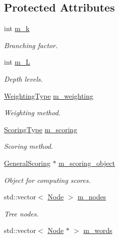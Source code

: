 \subsection*{Protected Attributes}
\begin{DoxyCompactItemize}
\item 
int \mbox{\hyperlink{class_d_bo_w2_1_1_templated_vocabulary_aa5f7f829033a49833fe4fb5652b99337}{m\+\_\+k}}
\begin{DoxyCompactList}\small\item\em Branching factor. \end{DoxyCompactList}\item 
int \mbox{\hyperlink{class_d_bo_w2_1_1_templated_vocabulary_a16735d9e2c8b901f01d541faea67971e}{m\+\_\+L}}
\begin{DoxyCompactList}\small\item\em Depth levels. \end{DoxyCompactList}\item 
\mbox{\hyperlink{namespace_d_bo_w2_a5de5c8a307aca9a84ffefda2a9bc467a}{Weighting\+Type}} \mbox{\hyperlink{class_d_bo_w2_1_1_templated_vocabulary_abf03c6430d630674ddca5bab9c120c51}{m\+\_\+weighting}}
\begin{DoxyCompactList}\small\item\em Weighting method. \end{DoxyCompactList}\item 
\mbox{\hyperlink{namespace_d_bo_w2_aa252a592dd607c6e60dede06ceef2722}{Scoring\+Type}} \mbox{\hyperlink{class_d_bo_w2_1_1_templated_vocabulary_a89d8aa037f2b5c3c5cc953734bb5cb9f}{m\+\_\+scoring}}
\begin{DoxyCompactList}\small\item\em Scoring method. \end{DoxyCompactList}\item 
\mbox{\hyperlink{class_d_bo_w2_1_1_general_scoring}{General\+Scoring}} $\ast$ \mbox{\hyperlink{class_d_bo_w2_1_1_templated_vocabulary_a34144d0e2056d6ed8b925a2937b67418}{m\+\_\+scoring\+\_\+object}}
\begin{DoxyCompactList}\small\item\em Object for computing scores. \end{DoxyCompactList}\item 
std\+::vector$<$ \mbox{\hyperlink{struct_d_bo_w2_1_1_templated_vocabulary_1_1_node}{Node}} $>$ \mbox{\hyperlink{class_d_bo_w2_1_1_templated_vocabulary_a82be6d310eae6f4f57a72d340489320b}{m\+\_\+nodes}}
\begin{DoxyCompactList}\small\item\em Tree nodes. \end{DoxyCompactList}\item 
std\+::vector$<$ \mbox{\hyperlink{struct_d_bo_w2_1_1_templated_vocabulary_1_1_node}{Node}} $\ast$ $>$ \mbox{\hyperlink{class_d_bo_w2_1_1_templated_vocabulary_a1665546b54f954d2d54d59a6982df3ca}{m\+\_\+words}}
\end{DoxyCompactItemize}


